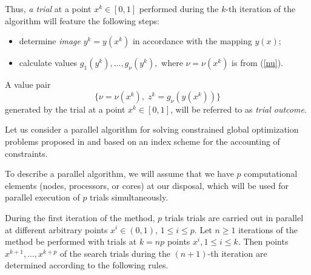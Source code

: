 \documentclass[
11pt,%
tightenlines,%
twoside,%
onecolumn,%
nofloats,%
nobibnotes,%
nofootinbib,%
superscriptaddress,%
noshowpacs,%
centertags]%
{revtex4}
\begin{document}
Thus, \textit{a trial} at a point $x^k \in [0,1]$ performed during the $k$-th iteration of the algorithm will feature the following steps:
\begin{itemize}
	\item determine \textit{image} $y^k=y(x^k)$ in accordance with the mapping $y(x)$;
	\item calculate values $g_1(y^k),..., g_\nu(y^k),$ where $\nu = \nu(x^k)$ is from (\ref{nu}). 
\end{itemize}
A value pair
\begin{equation} \label{trial_result}
 \{ \nu=\nu(x^k), \; z^k=g_\nu(y(x^k)) \} 
\end{equation}
generated by the trial at a point $x^k \in [0,1]$, will be referred to as \textit{trial outcome}.

Let us consider a parallel algorithm for solving constrained global optimization problems proposed in  \cite{Strongin2000,Strongin2013} and based on an index scheme for the accounting of constraints.

To describe a parallel algorithm, we will assume that we have $p$ computational elements (nodes, processors, or cores) at our disposal, which will be used for parallel execution of $p$ trials simultaneously. 

During the first iteration of the method, $p$ trials trials are carried out in parallel at different arbitrary points $x^i\in(0,1)$, $1\leq i \leq p$.
Let $n\geq 1$ iterations of the method be performed with trials at $k=np$ points $x^i, 1\leq i \leq k$. Then points $x^{k+1},...,x^{k+p}$ of the search trials during the $(n+1)$-th iteration are determined according to the following rules.
\end{document}
